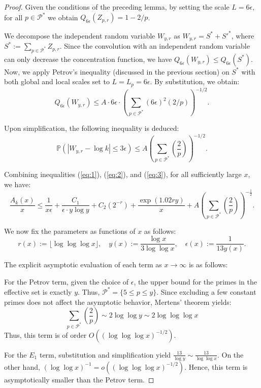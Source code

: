 \documentclass[12pt, a4paper]{article}
\theoremstyle{plain}
\theoremstyle{definition}
\begin{document}
\begin{proof}
Given the conditions of the preceding lemma, by setting the scale $L = 6\epsilon$, for all $p \in \mathcal{P}^*$ we obtain $Q_{6\epsilon}(Z_{p,r}) = 1 - 2/p$.

We decompose the independent random variable $W_{y,r}$ as $W_{y,r} = S^* + S'^*$, where $S^* := \sum_{p \in \mathcal{P}^*} Z_{p,r}$. Since the convolution with an independent random variable can only decrease the concentration function, we have $Q_{6\epsilon}(W_{y,r}) \leq Q_{6\epsilon}(S^*)$. Now, we apply Petrov's inequality (discussed in the previous section) on $S^*$ with both global and local scales set to $L = L_p = 6\epsilon$. By substitution, we obtain:
\[ Q_{6\epsilon}(W_{y,r}) \leq A \cdot 6\epsilon \cdot \left( \sum_{p \in \mathcal{P}^*} (6\epsilon)^2 (2/p) \right)^{-1/2}. \]

Upon simplification, the following inequality is deduced:
\begin{equation}
\mathbb{P}(|W_{y,r} - \log k| \leq 3\epsilon) \leq A \left( \sum_{p \in \mathcal{P}^*} \left(\frac{2}{p}\right) \right)^{-1/2}. \label{eq:3}
\end{equation}

Combining inequalities (\ref{eq:1}), (\ref{eq:2}), and (\ref{eq:3}), for all sufficiently large $x$, we have:
\[ \frac{A_k(x)}{x} \leq \frac{1}{x\epsilon} + \frac{C_1}{\epsilon \cdot y \log y} + C_2(2^{-r}) + \frac{\exp(1.02ry)}{x} + A \left( \sum_{p \in \mathcal{P}^*} \left(\frac{2}{p}\right) \right)^{-\frac{1}{2}}. \]

We now fix the parameters as functions of $x$ as follows:
\[ r(x) := \lfloor \log \log \log x \rfloor, \quad y(x) := \frac{\log x}{3 \log \log x}, \quad \epsilon(x) := \frac{1}{13y(x)}. \]

The explicit asymptotic evaluation of each term as $x \to \infty$ is as follows:

For the Petrov term, given the choice of $\epsilon$, the upper bound for the primes in the effective set is exactly $y$. Thus, $\mathcal{P}^* = \{5 \leq p \leq y\}$. Since excluding a few constant primes does not affect the asymptotic behavior, Mertens' theorem yields:
\[ \sum_{p \in \mathcal{P}^*} \left(\frac{2}{p}\right) \sim 2 \log \log y \sim 2 \log \log \log x \]
Thus, this term is of order $O((\log \log \log x)^{-1/2})$.

For the $E_1$ term, substitution and simplification yield $\frac{13}{\log y} \sim \frac{13}{\log \log x}$. On the other hand, $(\log \log x)^{-1} = o((\log \log \log x)^{-1/2})$. Hence, this term is asymptotically smaller than the Petrov term.


\end{proof}
\end{document}
